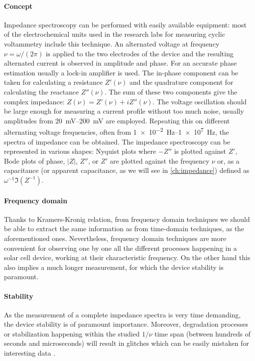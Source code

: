 	\paragraph{Concept}
	Impedance spectroscopy can be performed with easily available equipment: most of the electrochemical units used in the research labs for measuring cyclic voltammetry include this technique.
	An alternated voltage at frequency $\nu = \omega / (2 \pi)$ is applied to the two electrodes of the device and the resulting alternated current is observed in amplitude and phase.
	For an accurate phase estimation usually a lock-in amplifier is used.
	The in-phase component can be taken for calculating a resistance $Z'(\nu)$ and the quadrature component for calculating the reactance $Z''(\nu)$.
	The sum of these two components give the complex impedance: $Z(\nu) = Z'(\nu) + iZ''(\nu)$.
	The voltage oscillation should be large enough for measuring a current profile without too much noise, usually amplitudes from \SIrange{20}{200}{\mV} are employed.
	Repeating this on different alternating voltage frequencies, often from \SIrange{1e-2}{1e7}{\Hz}, the spectra of impedance can be obtained.
	The impedance spectroscopy can be represented in various shapes: Nyquist plots where $-Z''$ is plotted against $Z'$, Bode plots of phase, $|Z|$, $Z''$, or $Z'$ are plotted against the frequency $\nu$ or, as a capacitance (or apparent capacitance, as we will see in \cref{ch:impedance}) defined as $\omega^{-1}\Im(Z^{-1})$.

	\paragraph{Frequency domain}
Thanks to Kramers-Kronig relation, from frequency domain techniques we should be able to extract the same information as from time-domain techniques, as the aforementioned ones.
Nevertheless, frequency domain techniques are more convenient for observing one by one all the different processes happening in a solar cell device, working at their characteristic frequency.
On the other hand this also implies a much longer measurement, for which the device stability is paramount.

	\paragraph{Stability}
	As the measurement of a complete impedance spectra is very time demanding, the device stability is of paramount importance.
	Moreover, degradation processes or stabilization happening within the studied $1/\nu$ time span (between hundreds of seconds and microseconds) will result in glitches which can be easily mistaken for interesting data \cite{Jacobs2018,Moia2019}.

